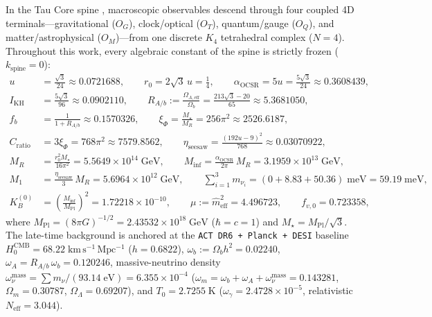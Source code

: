 \documentclass[11pt,a4paper]{article}
\begin{document}
In the Tau Core spine \cite{Olcsak2026Sub1,Olcsak2026Paper24,Olcsak2026Paper27}, macroscopic observables descend through four coupled 4D terminals—gravitational ($O_G$), clock/optical ($O_T$), quantum/gauge ($O_Q$), and matter/astrophysical ($O_M$)—from one discrete $K_4$ tetrahedral complex ($N = 4$). Throughout this work, every algebraic constant of the spine is strictly frozen ($k_{\mathrm{spine}} = 0$):
\begin{equation}
\begin{aligned}
  u &= \frac{\sqrt{3}}{24} \approx 0.0721688, \qquad r_0 = 2\sqrt{3}\,u = \frac{1}{4}, \qquad \alpha_{\mathrm{OCSR}} = 5u = \frac{5\sqrt{3}}{24} \approx 0.3608439, \\
  I_{\mathrm{KH}} &= \frac{5\sqrt{3}}{96} \approx 0.0902110, \qquad R_{A/b} := \frac{\Omega_{A,\mathrm{eff}}}{\Omega_b} = \frac{213\sqrt{3} - 20}{65} \approx 5.3681050, \\
  f_b &= \frac{1}{1 + R_{A/b}} \approx 0.1570326, \qquad \xi_\Phi = \frac{M_\star}{M_R} = 256\pi^2 \approx 2526.6187, \\
  C_{\mathrm{ratio}} &= 3\xi_\Phi = 768\pi^2 \approx 7579.8562, \qquad \eta_{\mathrm{seesaw}} = \frac{(192u - 9)^2}{768} \approx 0.03070922, \\
  M_R &= \frac{r_0^2 M_\star}{16\pi^2} = 5.5649\times 10^{14}\;\mathrm{GeV}, \qquad M_{\mathrm{inf}} = \frac{\alpha_{\mathrm{OCSR}}}{2\pi}\,M_R = 3.1959\times 10^{13}\;\mathrm{GeV}, \\
  M_1 &= \frac{\eta_{\mathrm{seesaw}}}{3}\,M_R = 5.6964\times 10^{12}\;\mathrm{GeV}, \qquad \sum_{i=1}^3 m_{\nu_i} = (0 + 8.83 + 50.36)\;\mathrm{meV} = 59.19\;\mathrm{meV}, \\
  K_B^{(0)} &= \left(\frac{M_{\mathrm{inf}}}{M_{\mathrm{Pl}}}\right)^{\!2} = 1.72218\times 10^{-10}, \qquad \mu := \hat{m}_{\mathrm{eff}}^2 = 4.496723, \qquad f_{v,0} = 0.723358,
\end{aligned}
\label{eq:locked-dictionary}
\end{equation}
where $M_{\mathrm{Pl}} = (8\pi G)^{-1/2} = 2.43532\times 10^{18}\;\mathrm{GeV}$ ($\hbar = c = 1$) and $M_\star = M_{\mathrm{Pl}}/\sqrt{3}$. The late-time background is anchored at the \texttt{ACT DR6 + Planck + DESI} baseline $H_0^{\mathrm{CMB}} = 68.22\;\mathrm{km\,s^{-1}\,Mpc^{-1}}$ ($h = 0.6822$), $\omega_b := \Omega_b h^2 = 0.02240$, $\omega_A = R_{A/b}\,\omega_b = 0.120246$, massive-neutrino density $\omega_\nu^{\mathrm{mass}} = \sum m_\nu / (93.14\;\mathrm{eV}) = 6.355\times 10^{-4}$ ($\omega_m = \omega_b + \omega_A + \omega_\nu^{\mathrm{mass}} = 0.143281$, $\Omega_m = 0.30787$, $\Omega_\Lambda = 0.69207$), and $T_0 = 2.7255\;\mathrm{K}$ ($\omega_\gamma = 2.4728\times 10^{-5}$, relativistic $N_{\mathrm{eff}} = 3.044$).
\end{document}
